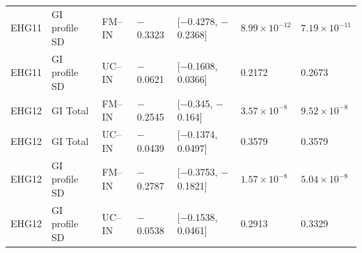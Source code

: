 \documentclass[10pt]{article}
\begin{document}
\begin{longtable}{p{1.5cm}p{2.5cm}p{2.4cm}p{1.4cm}p{3.2cm}p{1.8cm}p{2.0cm}}
EHG11 & GI profile SD & FM--IN & $-$0.3323 & [$-$0.4278, $-$0.2368] & $8.99\times10^{-12}$ & $7.19\times10^{-11}$ \\
EHG11 & GI profile SD & UC--IN & $-$0.0621 & [$-$0.1608, 0.0366] & 0.2172 & 0.2673 \\
EHG12 & GI Total & FM--IN & $-$0.2545 & [$-$0.345, $-$0.164] & $3.57\times10^{-8}$ & $9.52\times10^{-8}$ \\
EHG12 & GI Total & UC--IN & $-$0.0439 & [$-$0.1374, 0.0497] & 0.3579 & 0.3579 \\
EHG12 & GI profile SD & FM--IN & $-$0.2787 & [$-$0.3753, $-$0.1821] & $1.57\times10^{-8}$ & $5.04\times10^{-8}$ \\
EHG12 & GI profile SD & UC--IN & $-$0.0538 & [$-$0.1538, 0.0461] & 0.2913 & 0.3329 \\
\bottomrule
\end{longtable}
\end{document}
